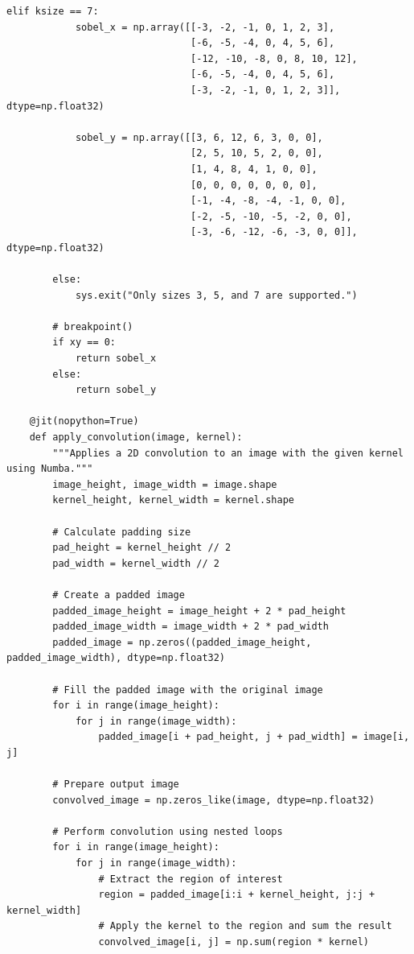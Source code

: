 \documentclass[11pt, conference, letterpaper]{IEEEtran}
\begin{document}
\begin{lstlisting}[style=python, caption={\texttt{image\_utils.py}}, label={lst:iutils}]
        elif ksize == 7:
            sobel_x = np.array([[-3, -2, -1, 0, 1, 2, 3],
                                [-6, -5, -4, 0, 4, 5, 6],
                                [-12, -10, -8, 0, 8, 10, 12],
                                [-6, -5, -4, 0, 4, 5, 6],
                                [-3, -2, -1, 0, 1, 2, 3]], dtype=np.float32)
    
            sobel_y = np.array([[3, 6, 12, 6, 3, 0, 0],
                                [2, 5, 10, 5, 2, 0, 0],
                                [1, 4, 8, 4, 1, 0, 0],
                                [0, 0, 0, 0, 0, 0, 0],
                                [-1, -4, -8, -4, -1, 0, 0],
                                [-2, -5, -10, -5, -2, 0, 0],
                                [-3, -6, -12, -6, -3, 0, 0]], dtype=np.float32)
    
        else:
            sys.exit("Only sizes 3, 5, and 7 are supported.")
    
        # breakpoint()
        if xy == 0:
            return sobel_x
        else:
            return sobel_y
    
    @jit(nopython=True)
    def apply_convolution(image, kernel):
        """Applies a 2D convolution to an image with the given kernel using Numba."""
        image_height, image_width = image.shape
        kernel_height, kernel_width = kernel.shape
        
        # Calculate padding size
        pad_height = kernel_height // 2
        pad_width = kernel_width // 2
        
        # Create a padded image
        padded_image_height = image_height + 2 * pad_height
        padded_image_width = image_width + 2 * pad_width
        padded_image = np.zeros((padded_image_height, padded_image_width), dtype=np.float32)
    
        # Fill the padded image with the original image
        for i in range(image_height):
            for j in range(image_width):
                padded_image[i + pad_height, j + pad_width] = image[i, j]
    
        # Prepare output image
        convolved_image = np.zeros_like(image, dtype=np.float32)
    
        # Perform convolution using nested loops
        for i in range(image_height):
            for j in range(image_width):
                # Extract the region of interest
                region = padded_image[i:i + kernel_height, j:j + kernel_width]
                # Apply the kernel to the region and sum the result
                convolved_image[i, j] = np.sum(region * kernel)
        

\end{lstlisting}
\end{document}
